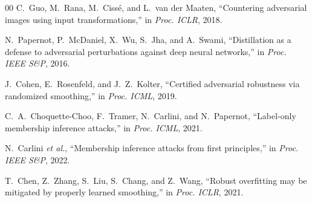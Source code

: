 \documentclass[conference]{IEEEtran}
\begin{document}
\begin{thebibliography}{00}
C.~Guo, M.~Rana, M.~Cissé, and L.~van der Maaten, ``Countering adversarial images using input transformations,'' in \textit{Proc. ICLR}, 2018.

N.~Papernot, P.~McDaniel, X.~Wu, S.~Jha, and A.~Swami, ``Distillation as a defense to adversarial perturbations against deep neural networks,'' in \textit{Proc. IEEE S\&P}, 2016.

J.~Cohen, E.~Rosenfeld, and J.~Z.~Kolter, ``Certified adversarial robustness via randomized smoothing,'' in \textit{Proc. ICML}, 2019.

C.~A.~Choquette-Choo, F.~Tramer, N.~Carlini, and N.~Papernot, ``Label-only membership inference attacks,'' in \textit{Proc. ICML}, 2021.

N.~Carlini \textit{et al.}, ``Membership inference attacks from first principles,'' in \textit{Proc. IEEE S\&P}, 2022.

T.~Chen, Z.~Zhang, S.~Liu, S.~Chang, and Z.~Wang, ``Robust overfitting may be mitigated by properly learned smoothing,'' in \textit{Proc. ICLR}, 2021.

\end{thebibliography}
\end{document}
